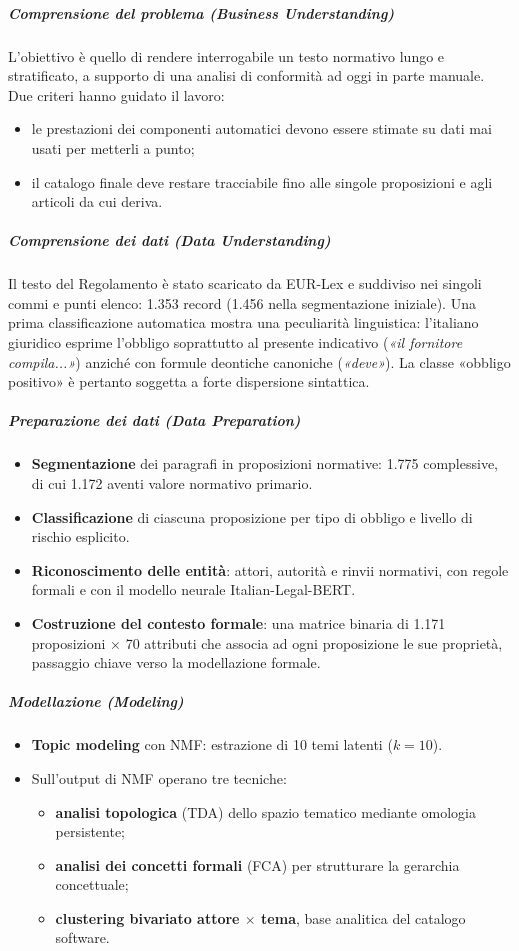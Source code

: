 \documentclass[12pt,a4paper,oneside]{report}
\begin{document}
\subparagraph{Comprensione del problema (Business Understanding)}
L'obiettivo è quello di rendere interrogabile un testo normativo lungo e stratificato, a supporto di una analisi di conformità ad oggi in parte manuale. Due criteri hanno guidato il lavoro:
\begin{itemize}
    \item le prestazioni dei componenti automatici devono essere stimate su dati mai usati per metterli a punto;
    \item il catalogo finale deve restare tracciabile fino alle singole proposizioni e agli articoli da cui deriva.
\end{itemize}

\subparagraph{Comprensione dei dati (Data Understanding)}
Il testo del Regolamento è stato scaricato da EUR-Lex e suddiviso nei singoli commi e punti elenco: 1.353 record (1.456 nella segmentazione iniziale). Una prima classificazione automatica mostra una peculiarità linguistica: l'italiano giuridico esprime l'obbligo soprattutto al presente indicativo (\textit{«il fornitore compila...»}) anziché con formule deontiche canoniche (\textit{«deve»}). La classe «obbligo positivo» è pertanto soggetta a forte dispersione sintattica.

\subparagraph{Preparazione dei dati (Data Preparation)}
\begin{itemize}
    \item \textbf{Segmentazione} dei paragrafi in proposizioni normative: 1.775 complessive, di cui 1.172 aventi valore normativo primario.
    \item \textbf{Classificazione} di ciascuna proposizione per tipo di obbligo e livello di rischio esplicito.
    \item \textbf{Riconoscimento delle entità}: attori, autorità e rinvii normativi, con regole formali e con il modello neurale Italian-Legal-BERT.
    \item \textbf{Costruzione del contesto formale}: una matrice binaria di 1.171 proposizioni $\times$ 70 attributi che associa ad ogni proposizione le sue proprietà, passaggio chiave verso la modellazione formale.
\end{itemize}

\subparagraph{Modellazione (Modeling)}
\begin{itemize}
    \item \textbf{Topic modeling} con NMF: estrazione di 10 temi latenti ($k=10$).
    \item Sull'output di NMF operano tre tecniche:
    \begin{itemize}
        \item \textbf{analisi topologica} (TDA) dello spazio tematico mediante omologia persistente;
        \item \textbf{analisi dei concetti formali} (FCA) per strutturare la gerarchia concettuale;
        \item \textbf{clustering bivariato attore $\times$ tema}, base analitica del catalogo software.
    \end{itemize}
\end{itemize}
\end{document}

